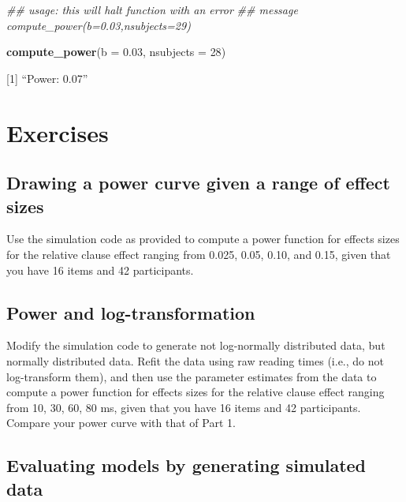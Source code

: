 \documentclass[12pt,]{krantz}
\newenvironment{Shaded}{\begin{snugshade}}{\end{snugshade}}
\newcommand{\CommentTok}[1]{\textcolor[rgb]{0.56,0.35,0.01}{\textit{#1}}}
\newcommand{\DataTypeTok}[1]{\textcolor[rgb]{0.13,0.29,0.53}{#1}}
\newcommand{\DecValTok}[1]{\textcolor[rgb]{0.00,0.00,0.81}{#1}}
\newcommand{\FloatTok}[1]{\textcolor[rgb]{0.00,0.00,0.81}{#1}}
\newcommand{\KeywordTok}[1]{\textcolor[rgb]{0.13,0.29,0.53}{\textbf{#1}}}
\newcommand{\NormalTok}[1]{#1}
\begin{document}
\begin{Shaded}
\begin{Highlighting}[]
\CommentTok{## usage: this will halt function with an error}
\CommentTok{## message compute_power(b=0.03,nsubjects=29)}

\KeywordTok{compute_power}\NormalTok{(}\DataTypeTok{b =} \FloatTok{0.03}\NormalTok{, }\DataTypeTok{nsubjects =} \DecValTok{28}\NormalTok{)}
\end{Highlighting}
\end{Shaded}

{[}1{]} ``Power: 0.07''

\hypertarget{sec:Simulationexercises}{%
\section{Exercises}\label{sec:Simulationexercises}}

\hypertarget{sec:SimulationexercisesPart1}{%
\subsection{Drawing a power curve given a range of effect sizes}\label{sec:SimulationexercisesPart1}}

Use the simulation code as provided to compute a power function for effects sizes for the relative clause effect ranging from 0.025, 0.05, 0.10, and 0.15, given that you have 16 items and 42 participants.

\hypertarget{sec:SimulationexercisesPart2}{%
\subsection{Power and log-transformation}\label{sec:SimulationexercisesPart2}}

Modify the simulation code to generate not log-normally distributed data, but normally distributed data. Refit the \citet{grodner} data using raw reading times (i.e., do not log-transform them), and then use the parameter estimates from the data to compute a power function for effects sizes for the relative clause effect ranging from 10, 30, 60, 80 ms, given that you have 16 items and 42 participants. Compare your power curve with that of Part 1.

\hypertarget{sec:SimulationexercisesPart3}{%
\subsection{Evaluating models by generating simulated data}\label{sec:SimulationexercisesPart3}}
\end{document}
